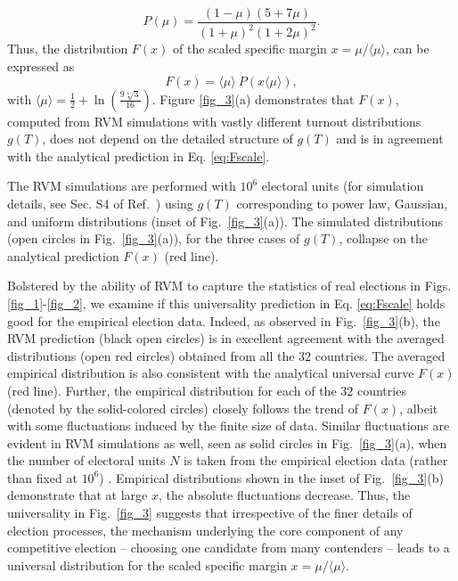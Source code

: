\documentclass[reprint,aps,prl,showpacs,twocolumn, superscriptaddress]{revtex4-2}
\begin{document}
\begin{equation}
    P\left(\mu\right) =  \frac{(1 - \mu)(5 + 7\mu)}{(1 + \mu)^2(1 + 2\mu)^2}. 
\end{equation}
Thus, the distribution $F(x)$ of the scaled specific margin $x = \mu / \langle \mu \rangle$, can be expressed as
\begin{equation}
 F\left(x\right) = \langle \mu \rangle ~ P\left( x \langle \mu \rangle \right),   
\label{eq:Fscale}
\end{equation}
with $\langle \mu \rangle = \frac{1}{2}+\ln \left(\frac{9 \sqrt[4]{3}}{16}\right)$. 
Figure \ref{fig_3}(a) demonstrates that $F(x)$, computed from RVM simulations with vastly different turnout distributions $g(T)$, does not depend on the detailed structure of $g(T)$ and is in agreement with the analytical prediction in Eq. \ref{eq:Fscale}.

 The RVM simulations are performed with $10^6$ electoral units (for simulation details, see Sec. S4 of Ref.~\cite{supp}) using $g(T)$ corresponding to power law, Gaussian, and uniform distributions (inset of Fig.~\ref{fig_3}(a)). The simulated distributions (open circles in Fig.~\ref{fig_3}(a)), for the three cases of $g(T)$, collapse on the analytical prediction $F(x)$ (red line). 
 
 Bolstered by the ability of RVM to capture the statistics of real elections in Figs.\ref{fig_1}-\ref{fig_2}, we examine if this universality prediction in Eq. \ref{eq:Fscale} holds good for the empirical election data. Indeed, as observed in Fig.~\ref{fig_3}(b), the RVM prediction (black open circles) is in excellent agreement with the averaged distributions (open red circles) obtained from all the $32$ countries. The averaged empirical distribution is also consistent with the analytical universal curve $F(x)$ (red line). Further, the empirical distribution for each of the $32$ countries (denoted by the solid-colored circles) closely follows the trend of $F(x)$, albeit with some fluctuations induced by the finite size of data. Similar fluctuations are evident in RVM simulations as well, seen as solid circles in Fig.~\ref{fig_3}(a), when the number of electoral units $N$ is taken from the empirical election data (rather than fixed at $10^6$) \cite{supp}. Empirical distributions shown in the inset of Fig.~\ref{fig_3}(b) demonstrate that at large $x$, the absolute fluctuations decrease. Thus, the universality in Fig.~\ref{fig_3} suggests that irrespective of the finer details of election processes, the mechanism underlying the core component of any competitive election -- choosing one candidate from many contenders -- leads to a universal distribution for the scaled specific margin $x=\mu/\langle \mu \rangle$.
 
\end{document}
